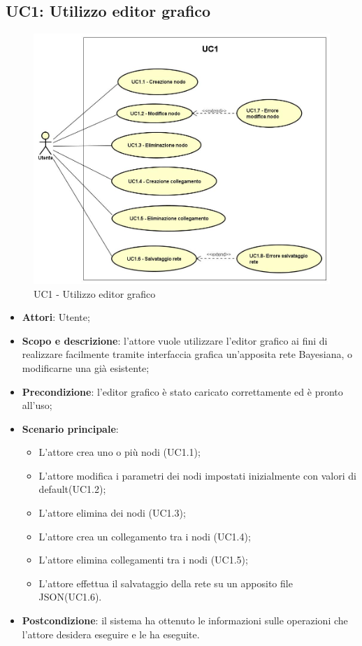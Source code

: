 \subsection{UC1: Utilizzo editor grafico}
\hypertarget{UC1}{} 
\begin{figure} [H]
	\centering
	\includegraphics[scale=0.45]{Img/UC1} 
	\caption{UC1 - Utilizzo editor grafico} \label{} 
\end{figure} 
\begin{itemize} 
	\item{\textbf{Attori}: Utente;}
	\item{\textbf{Scopo e descrizione}: l'attore vuole utilizzare l'editor grafico ai fini di realizzare facilmente tramite interfaccia grafica un'apposita rete Bayesiana, o modificarne una già esistente;} 
	\item{\textbf{Precondizione}: l'editor grafico è stato caricato correttamente ed è pronto all'uso;} 
	\item{\textbf{Scenario principale}: 
		\begin{itemize} 
			\item{L'attore crea uno o più nodi (UC1.1);} 
			\item{L'attore modifica i parametri dei nodi impostati inizialmente con valori di default(UC1.2);} 
			\item{L'attore elimina dei nodi (UC1.3)}; 
			\item{L'attore crea un collegamento tra i nodi (UC1.4);} 
			\item{L'attore elimina collegamenti tra i nodi (UC1.5);} 
			\item{L'attore effettua il salvataggio della rete su un apposito file JSON(UC1.6).} 
		\end{itemize} 
	} 
	\item{\textbf{Postcondizione}: il sistema ha ottenuto le informazioni sulle operazioni che l'attore desidera eseguire e le ha eseguite.} 
\end{itemize} 

